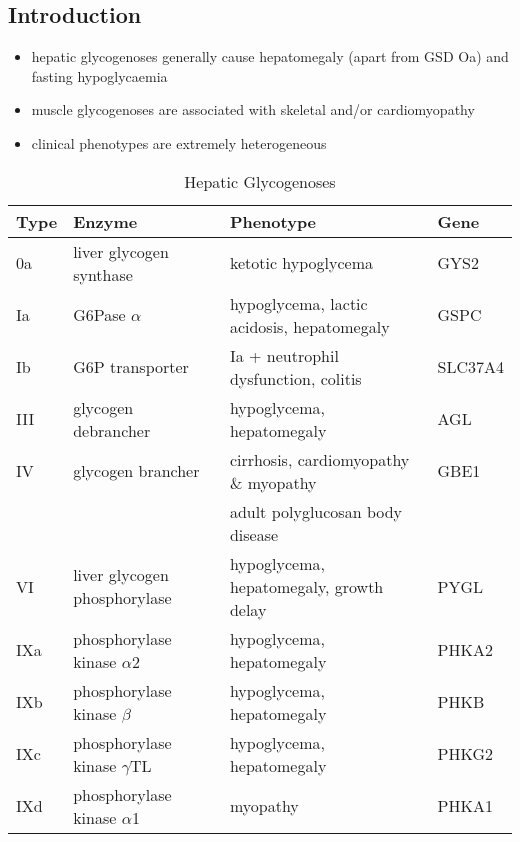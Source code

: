 \documentclass{scrartcl}
\begin{document}
\subsection{Introduction}
\label{sec:org7f5dda9}
\begin{itemize}
\item hepatic glycogenoses generally cause hepatomegaly (apart from GSD
Oa) and fasting hypoglycaemia
\item muscle glycogenoses are associated with skeletal and/or
cardiomyopathy
\item clinical phenotypes are extremely heterogeneous
\end{itemize}
\begin{table}[htbp]
\caption{\label{tab:org035e8fb}Hepatic Glycogenoses}
\centering
\begin{tabular}{llll}
Type & Enzyme & Phenotype & Gene\\
\hline
0a & liver glycogen synthase & ketotic hypoglycema & GYS2\\
Ia & G6Pase \(\alpha\) & hypoglycema, lactic acidosis, hepatomegaly & GSPC\\
Ib & G6P transporter & Ia + neutrophil dysfunction, colitis & SLC37A4\\
III & glycogen debrancher & hypoglycema, hepatomegaly & AGL\footnotemark\\
IV & glycogen brancher & cirrhosis, cardiomyopathy \& myopathy & GBE1\\
 &  & adult polyglucosan body disease & \\
VI & liver glycogen phosphorylase & hypoglycema, hepatomegaly, growth delay & PYGL\\
\hline
IXa & phosphorylase kinase \(\alpha\)2 & hypoglycema, hepatomegaly & PHKA2\\
IXb & phosphorylase kinase \(\beta\) & hypoglycema, hepatomegaly & PHKB\\
IXc & phosphorylase kinase \(\gamma\)TL & hypoglycema, hepatomegaly & PHKG2\\
IXd & phosphorylase kinase \(\alpha\)1 & myopathy & PHKA1\\
\end{tabular}
\end{table}
\end{document}
